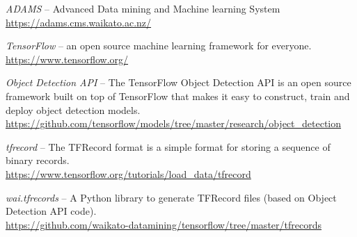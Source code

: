 
\begin{thebibliography}{999}

		\textit{ADAMS} -- Advanced Data mining and Machine learning System \\
		\url{https://adams.cms.waikato.ac.nz/}{}
		
                \textit{TensorFlow} -- an open source machine learning framework for everyone. \\
		\url{https://www.tensorflow.org/}{}

                \textit{Object Detection API} -- The TensorFlow Object Detection API is an open
                source framework built on top of TensorFlow that makes it easy to construct,
                train and deploy object detection models. \\
		\url{https://github.com/tensorflow/models/tree/master/research/object_detection}{}

                \textit{tfrecord} -- The TFRecord format is a simple format for storing a
                sequence of binary records. \\
		\url{https://www.tensorflow.org/tutorials/load_data/tfrecord}{}

                \textit{wai.tfrecords} -- A Python library to generate TFRecord files (based on
                Object Detection API code). \\
		\url{https://github.com/waikato-datamining/tensorflow/tree/master/tfrecords}{}

\end{thebibliography}
